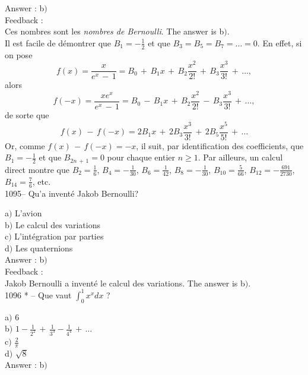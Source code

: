 ﻿\documentclass[letterpaper, 12pt]{article}
\begin{document}
Answer : b$)$\\

Feedback : \\
Ces nombres sont les {\sl nombres de Bernoulli}. The answer is
b$)$. \\
Il est facile de d\'emontrer que $B_1=-\frac12$ et que
$B_3=B_5=B_7=\ldots=0$. En effet, si on pose
$$\displaystyle{f(x)=\frac
x{e^x\,-\,1}=B_0\,+\,B_1x\,+\,B_2\frac{x^2}{2!}\,+\,B_3\frac{x^3}{3!}\,+\,\ldots,}$$
alors
$$\displaystyle{f(-x)=\frac{xe^x}{e^x\,-\,1}=B_0\,-\,B_1x\,+\,B_2\frac{x^2}{2!}\,-\,B_3\frac{x^3}{3!}\,+\,\ldots,}$$
de sorte que
$$\displaystyle{f(x)\,-\,f(-x)=2B_1x\,+\,2B_3\frac{x^3}{3!}\,+\,2B_5\frac{x^5}{5!}\,+\,\ldots}$$
Or, comme $f(x)\,-\,f(-x)=-x$, il suit, par identification des
coefficients, que $B_1=-\frac12$ et que $B_{2n\,+\,1}=0$ pour chaque
entier $n\ge1$. Par ailleurs, un calcul direct montre que
$B_2=\frac16$, $B_4=-\frac1{30}$, $B_6=\frac1{42}$,
$B_8=-\frac1{30}$, $B_{10}=\frac5{66}$, $B_{12}=-\frac{691}{2730}$,
$B_{14}=\frac76$, etc.\\


1095-- Qu'a invent\'e Jakob Bernoulli?

a$)$ L'avion\\
b$)$ Le calcul des variations \\
c$)$ L'int\'egration par parties  \\
d$)$ Les quaternions  \\

Answer : b$)$\\

Feedback : \\
Jakob Bernoulli a invent\'e le calcul des variations.
The answer is b$)$.\\

1096 * -- Que vaut $\int_0^1x^xdx$ ?

a$)$ $6$ \\ [2mm] b$)$
$1-\frac1{2^2}\,+\,\frac1{3^3}-\frac1{4^4}\,+\,\ldots$ \\ [3 mm]
c$)$ $\frac2{\pi}$  \\ [2mm]
d$)$ $\sqrt8$\\

Answer : b$)$\\
\end{document}
